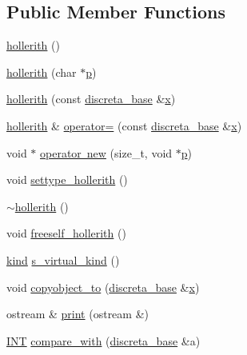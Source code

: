 \subsection*{Public Member Functions}
\begin{DoxyCompactItemize}
\item 
\mbox{\hyperlink{classhollerith_a13144dcd320e47e22e7969297188154e}{hollerith}} ()
\item 
\mbox{\hyperlink{classhollerith_a749438d664a740f9ad7da188494d3077}{hollerith}} (char $\ast$\mbox{\hyperlink{alphabet2_8_c_a533391314665d6bf1b5575e9a9cd8552}{p}})
\item 
\mbox{\hyperlink{classhollerith_ab2b25c6d04670336506b94a38d83ae00}{hollerith}} (const \mbox{\hyperlink{classdiscreta__base}{discreta\+\_\+base}} \&\mbox{\hyperlink{alphabet2_8_c_a6150e0515f7202e2fb518f7206ed97dc}{x}})
\item 
\mbox{\hyperlink{classhollerith}{hollerith}} \& \mbox{\hyperlink{classhollerith_a29643fcee8fc15a9dffa8c8257428f0c}{operator=}} (const \mbox{\hyperlink{classdiscreta__base}{discreta\+\_\+base}} \&\mbox{\hyperlink{alphabet2_8_c_a6150e0515f7202e2fb518f7206ed97dc}{x}})
\item 
void $\ast$ \mbox{\hyperlink{classhollerith_aab36d557528e2e88a792442fa122d682}{operator new}} (size\+\_\+t, void $\ast$\mbox{\hyperlink{alphabet2_8_c_a533391314665d6bf1b5575e9a9cd8552}{p}})
\item 
void \mbox{\hyperlink{classhollerith_a23bbd4acfc88a0e90f1245f243f51f76}{settype\+\_\+hollerith}} ()
\item 
\mbox{\hyperlink{classhollerith_ab7c32776df398e3a60acc954bb093431}{$\sim$hollerith}} ()
\item 
void \mbox{\hyperlink{classhollerith_a240d1b30780c9e09323d0b3ad5e2d1f7}{freeself\+\_\+hollerith}} ()
\item 
\mbox{\hyperlink{discreta_8h_aaf25ee7e2306d78c74ec7bc48f092e81}{kind}} \mbox{\hyperlink{classhollerith_a868bba1481a52276f83e18e3b4280b31}{s\+\_\+virtual\+\_\+kind}} ()
\item 
void \mbox{\hyperlink{classhollerith_aca74f6b673481c6e2b3b553171215f9c}{copyobject\+\_\+to}} (\mbox{\hyperlink{classdiscreta__base}{discreta\+\_\+base}} \&\mbox{\hyperlink{alphabet2_8_c_a6150e0515f7202e2fb518f7206ed97dc}{x}})
\item 
ostream \& \mbox{\hyperlink{classhollerith_a35f4d87aef8f1dd7f09f57ace1c5ea4a}{print}} (ostream \&)
\item 
\mbox{\hyperlink{galois_8h_a09fddde158a3a20bd2dcadb609de11dc}{I\+NT}} \mbox{\hyperlink{classhollerith_a9dfd88b7057204bd4ea1ec227f05d84a}{compare\+\_\+with}} (\mbox{\hyperlink{classdiscreta__base}{discreta\+\_\+base}} \&a)

\end{DoxyCompactItemize}
